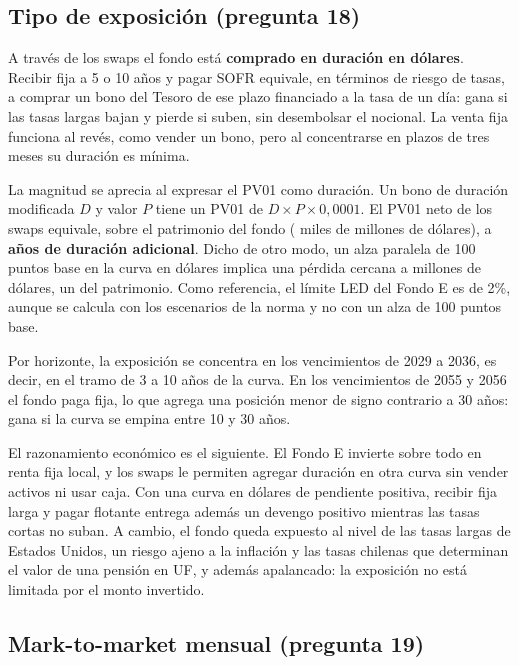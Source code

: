 \documentclass[11pt,letterpaper]{article}
\begin{document}
\subsection{Tipo de exposición (pregunta 18)}

A través de los swaps el fondo está \textbf{comprado en duración en dólares}. Recibir
fija a 5 o 10 años y pagar SOFR equivale, en términos de riesgo de tasas, a comprar un
bono del Tesoro de ese plazo financiado a la tasa de un día: gana si las tasas largas
bajan y pierde si suben, sin desembolsar el nocional. La venta fija funciona al revés,
como vender un bono, pero al concentrarse en plazos de tres meses su duración es
mínima.

La magnitud se aprecia al expresar el PV01 como duración. Un bono de duración
modificada $D$ y valor $P$ tiene un PV01 de $D \times P \times 0{,}0001$. El PV01 neto
de los swaps equivale, sobre el patrimonio del fondo (\MIIpatBaseUsd{} miles de
millones de dólares), a \textbf{\MIIIduracion{} años de duración adicional}. Dicho de
otro modo, un alza paralela de 100 puntos base en la curva en dólares implica una
pérdida cercana a \MIIIcienPb{} millones de dólares, un \MIIIcienPbPat{} del
patrimonio. Como referencia, el límite LED del Fondo E es de 2\%, aunque se calcula con
los escenarios de la norma y no con un alza de 100 puntos base.

Por horizonte, la exposición se concentra en los vencimientos de 2029 a 2036, es decir,
en el tramo de 3 a 10 años de la curva. En los vencimientos de 2055 y 2056 el fondo
paga fija, lo que agrega una posición menor de signo contrario a 30 años: gana si la
curva se empina entre 10 y 30 años.

El razonamiento económico es el siguiente. El Fondo E invierte sobre todo en renta fija
local, y los swaps le permiten agregar duración en otra curva sin vender activos ni
usar caja. Con una curva en dólares de pendiente positiva, recibir fija larga y pagar
flotante entrega además un devengo positivo mientras las tasas cortas no suban. A
cambio, el fondo queda expuesto al nivel de las tasas largas de Estados Unidos, un
riesgo ajeno a la inflación y las tasas chilenas que determinan el valor de una pensión
en UF, y además apalancado: la exposición no está limitada por el monto invertido.

\subsection{Mark-to-market mensual (pregunta 19)}
\end{document}

